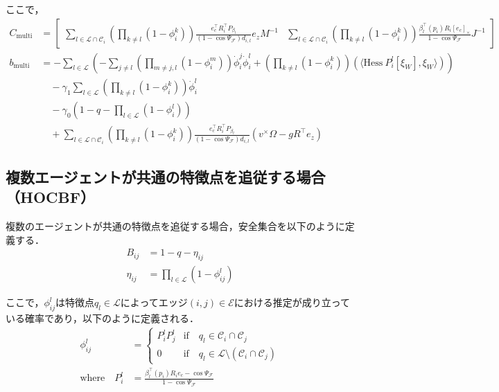 ここで，
\begin{equation}
\begin{aligned}
C_{\mathrm{multi}} &= \begin{bmatrix}
\sum_{l \in \mathcal{L} \cap \mathcal{C}_i} \left( \prod_{k \neq l} (1 - \phi_{i}^k) \right) \frac{e_c^\top R_i^\top P_{\beta_l}}{(1 - \cos \Psi_\mathcal{F}) d_{i,l}} e_z M^{-1} & \sum_{l \in \mathcal{L} \cap \mathcal{C}_i} \left( \prod_{k \neq l} (1 - \phi_{i}^k) \right) \frac{\beta_l^\top(p_i) R_i [e_c]_\times}{1 - \cos \Psi_\mathcal{F}} J^{-1}
\end{bmatrix} \\
b_{\mathrm{multi}} &= -\sum_{l \in \mathcal{L}} \left( -\sum_{j \neq l} \left( \prod_{m \neq j, l} (1 - \phi_{i}^m) \right) \dot{\phi}_i^j \dot{\phi}^l_{i} + \left( \prod_{k \neq l} (1 - \phi_{i}^k) \right) (\langle \mathrm{Hess}\:P_i^l[\xi_W], \xi_W \rangle) \right) \\
&\quad - \gamma_1 \sum_{l \in \mathcal{L}} \left( \prod_{k \neq l} (1 - \phi_{i}^k) \right) \dot{\phi}^l_{i} \\
&\quad - \gamma_0 (1 - q - \prod_{l \in \mathcal{L}} (1 - \phi_{i}^l)) \\
&\quad + \sum_{l \in \mathcal{L} \cap \mathcal{C}_i} \left( \prod_{k \neq l} (1 - \phi_{i}^k) \right) \frac{e_c^\top R_i^\top P_{\beta_l}}{(1 - \cos \Psi_\mathcal{F}) d_{i,l}} (v^\times \Omega - g R^\top e_z)
\label{eq:hocbf_qp_multi_parameters}
\end{aligned}
\end{equation}

\subsection{複数エージェントが共通の特徴点を追従する場合（HOCBF）}

複数のエージェントが共通の特徴点を追従する場合，安全集合を以下のように定義する．
\begin{equation}
\begin{aligned}
B_{ij} &= 1 - q - \eta_{ij} \\
\eta_{ij} &= \prod_{l \in \mathcal{L}} (1 - \phi_{ij}^l)
\label{eq:safe_set_edge_hocbf}
\end{aligned}
\end{equation}

ここで，$\phi_{ij}^l$は特徴点$q_l \in \mathcal{L}$によってエッジ$(i,j) \in \mathcal{E}$における推定が成り立っている確率であり，以下のように定義される．
\begin{equation}
\begin{aligned}
\phi_{ij}^l &= \left\{ \begin{array}{ll}
P_i^l P_j^l & \mathrm{if} \quad q_l \in \mathcal{C}_i \cap \mathcal{C}_j \\
0 & \mathrm{if} \quad q_l \in \mathcal{L} \setminus (\mathcal{C}_i \cap \mathcal{C}_j)
\end{array} \right. \\
\mathrm{where} \quad P_i^l &= \frac{\beta_l^\top(p_i) R_i e_c - \cos \Psi_\mathcal{F}}{1 - \cos \Psi_\mathcal{F}}
\label{eq:probability_edge_hocbf}
\end{aligned}
\end{equation}

